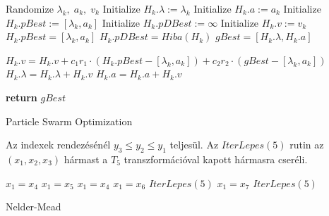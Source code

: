 \documentclass[oneside,titlepage,12pt,a4paper]{report}
\begin{document}
\begin{algorithm}[htp] 
\begin{algorithmic}[1]
		\State Randomize $\lambda_k,\; a_k, \; v_k$	 		
		\State Initialize $H_k.\lambda:=\lambda_k$ 
		\State Initialize $H_k.a:=a_k$			
		\State Initialize $H_k.pBest:=[\lambda_k, a_k]$    
		\State Initialize $H_k.pDBest:=\infty$   
		\State Initialize $H_k.v:=v_k$   
	\EndFor
			  
				\State $H_k.pBest=[\lambda_k, a_k]$
				\State $H_k.pDBest= Hiba(H_k)$
			\EndIf
		\EndFor		
		  
				\State $gBest=[H_k.\lambda, H_k.a]$
			\EndIf

							
			\State $H_k.v = H_k.v + c_1 r_1 \cdot (H_k.pBest-[\lambda_k, a_k]) 
						 + c_2 r_2 \cdot (gBest-[\lambda_k, a_k])$ 
			\State $H_k.\lambda = H_k.\lambda + H_k.v$	
			\State $H_k.a = H_k.a + H_k.v$
			
		\EndFor					
	\EndFor
	\State \textbf{return} $gBest$
	\EndFunction
\end{algorithmic}
\caption{Particle Swarm Optimization}
\label{alg:pso}
\end{algorithm}

\fi

\newpage
Az indexek rendezésénél
$y_3\le y_2\le y_1$ teljesül. Az $IterLepes(5)$ rutin az 
$(x_1,x_2,x_3)$ hármast a $T_5$ transzformációval kapott
hármasra cseréli.
\bigskip

\begin{algorithm}[htb!] 
\begin{algorithmic}[1]
		\State $x_1 = x_4$
			\State $x_1 = x_5$
		\Else
			\State $x_1 = x_4$
		\EndIf
				\State $x_1 = x_6$
			\Else
				\State $IterLepes(5)$
			\EndIf
				\State $x_1 = x_7$
			\Else
				\State $IterLepes(5)$
			\EndIf
		\EndIf
	\EndIf
	\EndFunction
\end{algorithmic}
\caption{Nelder-Mead}
\label{alg:NM}
\end{algorithm}
\end{document}
